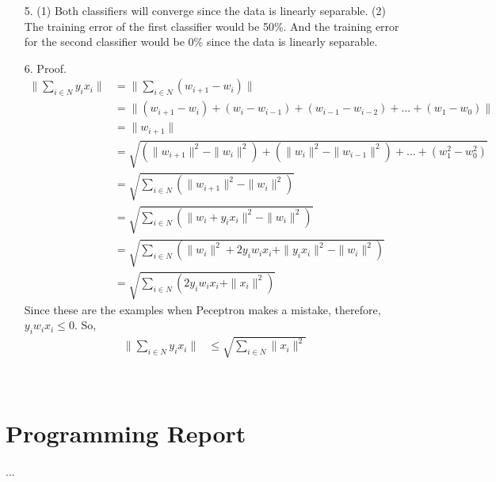 \documentclass[11pt]{article}
\begin{document}
\begin{itemize}
\item[5.]
(1) Both classifiers will converge since the data is linearly separable.
(2) The training error of the first classifier would be 50\%. And the training error for the second classifier would be 0\% since the data is linearly separable.
\item[6.]
Proof.
\begin{align*}
\|\sum_{i\in N} y_i x_i\| & = \|\sum_{i\in N} (w_{i+1}-w_i)\| \\
                          & = \| (w_{i+1}-w_i)+(w_i-w_{i-1})+(w_{i-1}-w_{i-2})+...+(w_1-w_0) \| \\
													& = \|w_{i+1}\| \\
													& = \sqrt{(\|w_{i+1}\|^2-\|w_i\|^2)+(\|w_i\|^2-\|w_{i-1}\|^2)+...+(w_1^2-w_0^2)} \\
													& = \sqrt{\sum_{i\in N} (\|w_{i+1}\|^2-\|w_i\|^2)} \\
													& = \sqrt{\sum_{i\in N} (\|w_i+y_i x_i\|^2-\|w_i\|^2)} \\
													& = \sqrt{\sum_{i\in N} (\|w_i\|^2+2y_i w_i x_i+\|y_i x_i\|^2-\|w_i\|^2)} \\
													& = \sqrt{\sum_{i\in N} (2y_i w_i x_i+\|x_i\|^2)}
\end{align*}
Since these are the examples when Peceptron makes a mistake, therefore, \(y_i w_i x_i\leq 0\). So,
\begin{align*}
\|\sum_{i\in N} y_i x_i\| & \leq \sqrt{\sum_{i\in N} \|x_i\|^2}
\end{align*}
\end{itemize}
\\

\section{Programming Report}
...

%
%
\end{document}
